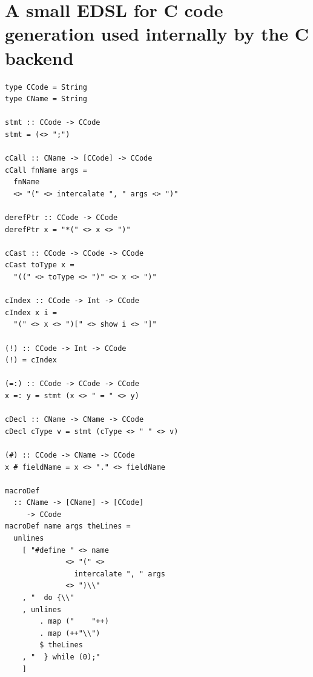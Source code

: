 \documentclass[sigplan,anonymous,review]{acmart}
\newcommand{\showtodos}{}  %
\newenvironment{todo}
  {\ifthenelse{\isundefined{\showtodos}}{\comment}{\begin{tcolorbox}
    \textbf{TODO}:}}
  {\ifthenelse{\isundefined{\showtodos}}{\endcomment}{\end{tcolorbox}}
  }
\providecommand\BibTeX{{%
    \normalfont B\kern-0.5em{\scshape i\kern-0.25em b}\kern-0.8em\TeX}}}
\begin{document}
\section{A small EDSL for C code generation used internally by the C backend}
\begin{lstlisting}[basicstyle=\tiny]
type CCode = String
type CName = String

stmt :: CCode -> CCode
stmt = (<> ";")

cCall :: CName -> [CCode] -> CCode
cCall fnName args =
  fnName
  <> "(" <> intercalate ", " args <> ")"

derefPtr :: CCode -> CCode
derefPtr x = "*(" <> x <> ")"

cCast :: CCode -> CCode -> CCode
cCast toType x =
  "((" <> toType <> ")" <> x <> ")"

cIndex :: CCode -> Int -> CCode
cIndex x i =
  "(" <> x <> ")[" <> show i <> "]"

(!) :: CCode -> Int -> CCode
(!) = cIndex

(=:) :: CCode -> CCode -> CCode
x =: y = stmt (x <> " = " <> y)

cDecl :: CName -> CName -> CCode
cDecl cType v = stmt (cType <> " " <> v)

(#) :: CCode -> CName -> CCode
x # fieldName = x <> "." <> fieldName

macroDef
  :: CName -> [CName] -> [CCode]
     -> CCode
macroDef name args theLines =
  unlines
    [ "#define " <> name
              <> "(" <>
                intercalate ", " args
              <> ")\\"
    , "  do {\\"
    , unlines
        . map ("    "++)
        . map (++"\\")
        $ theLines
    , "  } while (0);"
    ]
\end{lstlisting}






%   
%   
\end{document}
